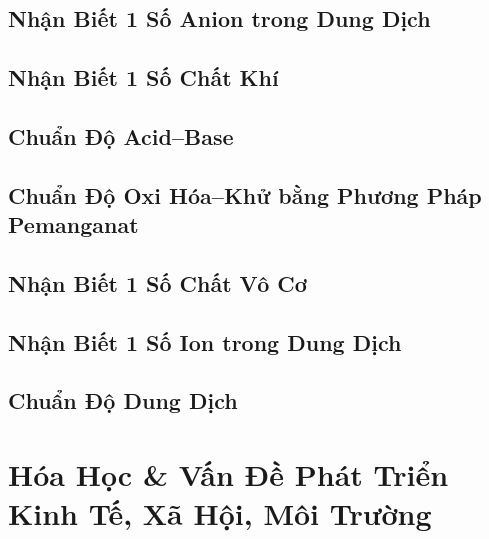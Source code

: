 \documentclass{article}
\numberwithin{equation}{section}
\begin{document}
\subsection{Nhận Biết 1 Số Anion trong Dung Dịch}


\subsection{Nhận Biết 1 Số Chất Khí}


\subsection{Chuẩn Độ Acid--Base}


\subsection{Chuẩn Độ Oxi Hóa--Khử bằng Phương Pháp Pemanganat}


\subsection{Nhận Biết 1 Số Chất Vô Cơ}


\subsection{Nhận Biết 1 Số Ion trong Dung Dịch}


\subsection{Chuẩn Độ Dung Dịch}


\section{Hóa Học \& Vấn Đề Phát Triển Kinh Tế, Xã Hội, Môi Trường}
\end{document}
